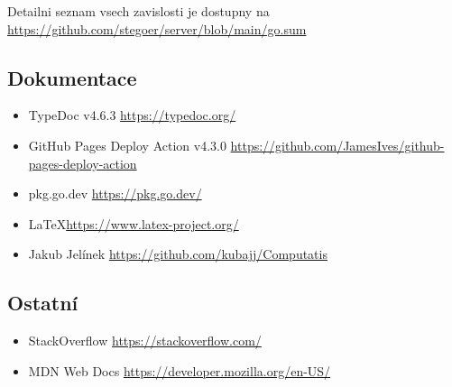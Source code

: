 Detailni seznam vsech zavislosti je dostupny na
\url{https://github.com/stegoer/server/blob/main/go.sum}

\subsection{Dokumentace}\label{subsec:dokumentace}

\begin{itemize}
    \item TypeDoc v4.6.3 \url{https://typedoc.org/}
    \item GitHub Pages Deploy Action v4.3.0 \url{https://github.com/JamesIves/github-pages-deploy-action}
    \item pkg.go.dev \url{https://pkg.go.dev/}
    \item \LaTeX \url{https://www.latex-project.org/}
    \item Jakub Jelínek \url{https://github.com/kubajj/Computatis}
\end{itemize}

\subsection{Ostatní}\label{subsec:ostatni}

\begin{itemize}
    \item StackOverflow \url{https://stackoverflow.com/}
    \item MDN Web Docs \url{https://developer.mozilla.org/en-US/}
\end{itemize}
